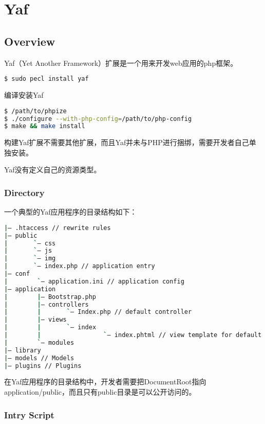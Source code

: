 \part{Yaf}


\chapter{Overview}

Yaf（Yet Another Framework）扩展是一个用来开发web应用的php框架。

\begin{lstlisting}[language=bash]
$ sudo pecl install yaf
\end{lstlisting}

\begin{example}
编译安装Yaf
\begin{lstlisting}[language=bash]
$ /path/to/phpize
$ ./configure --with-php-config=/path/to/php-config
$ make && make install
\end{lstlisting}
\end{example}



构建Yaf扩展不需要其他扩展，而且Yaf并未与PHP进行捆绑，需要开发者自己单独安装。


Yaf没有定义自己的资源类型。




\section{Directory}


一个典型的Yaf应用程序的目录结构如下：

\begin{lstlisting}[language=bash]
|— .htaccess // rewrite rules
|— public
|       `— css
|       `— js
|       `— img
|       `— index.php // application entry
|— conf
|        `— application.ini // application config
|— application
|        |— Bootstrap.php
|        |— controllers
|        |       `— Index.php // default controller
|        |— views
|        |       `— index
|        |                 `— index.phtml // view template for default action
|        `— modules
|— library
|— models // Models
|— plugins // Plugins
\end{lstlisting}

在Yaf应用程序的目录结构中，开发者需要把DocumentRoot指向application/public，而且只有public目录是可以公开访问的。



\section{Intry Script}


